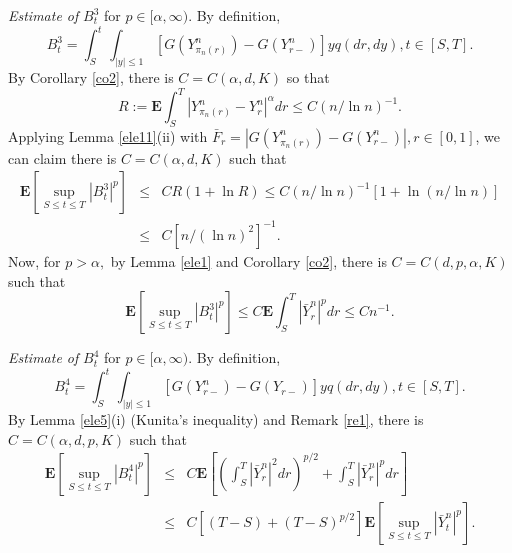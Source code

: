 \documentclass[11pt]{amsart}
\theoremstyle{plain}
\numberwithin{equation}{section}
\begin{document}
\emph{Estimate of }$B_t^{3}$ for $p\in \lbrack \alpha ,\infty )$. By
definition,\begin{equation*}
B_{t}^{3}=\int_{S}^{t}\int_{\left\vert y\right\vert \leq 1}\left[ G\left(
Y_{\pi _{n}\left( r\right) }^{n}\right) -G\left( Y_{r-}^{n}\right) \right]
yq\left( dr,dy\right) ,t\in \left[ S,T\right] .
\end{equation*}By Corollary \ref{co2}, there is $C=C\left( \alpha,d ,K\right) $ so that 
\begin{equation*}
R:=\mathbf{E}\int_{S}^{T}\left\vert Y_{\pi _{n}\left( r\right)
}^{n}-Y_{r}^{n}\right\vert ^{\alpha }dr\leq C\left( n/\ln n\right) ^{-1}.
\end{equation*}Applying Lemma \ref{ele11}(ii) with $\bar{F}_{r}=\left\vert G\left( Y_{\pi
_{n}\left( r\right) }^{n}\right) -G\left( Y_{r-}^{n}\right) \right\vert
,r\in \left[ 0,1\right] $, we can claim there is $C=C\left( \alpha
,d,K\right) $ such that\begin{eqnarray*}
\mathbf{E}\left[ \sup_{S\leq t\leq T}\left\vert B_{t}^{3}\right\vert ^{p}\right] &\leq &CR\left( 1+\ln R\right) \leq C\left( n/\ln n\right)
^{-1}[1+\ln \left( n/\ln n\right) ] \\
&\leq &C\left[ n/\left( \ln n\right) ^{2}\right] ^{-1}.
\end{eqnarray*}Now, for $p>\alpha ,$ by Lemma \ref{ele1} and Corollary \ref{co2}, there is $C=C\left( d,p,\alpha ,K\right) $ such that\begin{equation*}
\mathbf{E}\left[ \sup_{S\leq t\leq T}\left\vert B_{t}^{3}\right\vert ^{p}\right] \leq C\mathbf{E}\int_{S}^{T}\left\vert \bar{Y}_{r}^{n}\right\vert
^{p}dr\leq Cn^{-1}.
\end{equation*}

\emph{Estimate of }$B_t^{4}$ for $p\in \lbrack \alpha ,\infty )$. By
definition,\begin{equation*}
B_{t}^{4}=\int_{S}^{t}\int_{\left\vert y\right\vert \leq 1}\left[ G\left(
Y_{r-}^{n}\right) -G\left( Y_{r-}\right) \right] yq\left( dr,dy\right) ,t\in \left[ S,T\right] .
\end{equation*}By Lemma \ref{ele5}(i) (Kunita's inequality) and Remark \ref{re1}, there is $C=C\left( \alpha,d ,p,K\right) $ such that 
\begin{eqnarray*}
\mathbf{E}\left[ \sup_{S\leq t\leq T}\left\vert B_{t}^{4}\right\vert ^{p}\right] &\leq &C\mathbf{E}\left[ \left( \int_{S}^{T}\left\vert \bar{Y}_{r}^{n}\right\vert ^{2}dr\right) ^{p/2}+\int_{S}^{T}\left\vert \bar{Y}_{r}^{n}\right\vert ^{p}dr\right] \\
&\leq &C\left[ \left( T-S\right) +(T-S)^{p/2}\right] \mathbf{E}\left[
\sup_{S\leq t\leq T}\left\vert \bar{Y}_{t}^{n}\right\vert ^{p}\right] .
\end{eqnarray*}
\end{document}

